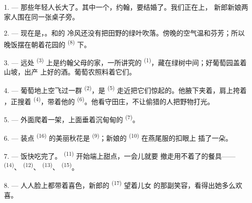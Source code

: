 
\VUsaut{4.0mm}
\VUsaut{1.6mm}
\VUsaut{3.2mm}

\VUsaut{1.6mm}
\VUsaut{2.6mm}

\VUsaut{3.0mm}

1. --- 那些年轻人长大了。其中一个，约翰，要结婚了。我们正在上，
新郎新娘两家人围在同一张桌子旁。

2. --- 现在是，。和的
冷风还没有把田野的绿叶吹落。傍晚的空气温和芬芳；所以晚饭摆在朝着花园的
 \textsuperscript{(8)} 下。

3. --- 远处 \textsuperscript{(3)} 上是约翰父母的家，一所讲究的
 \textsuperscript{(1)}，藏在绿树中间；好葡萄园盖着山坡，出产
上好的酒。葡萄农照料着它们。

4. --- 葡萄地上空飞过一群 \textsuperscript{(2)}，是
\textsuperscript{(5)} 走近把它们惊起的。他腋下夹着，肩上挎着
，正搜着 \textsuperscript{(4)}，带着他的
\textsuperscript{(6)}。他看守田庄，不让偷猎的人把野物打光。

5. --- 外面爬着一架，上面垂着沉甸甸的
 \textsuperscript{(7)}。

6. --- 装点 \textsuperscript{(16)} 的美丽秋花是
\textsuperscript{(9)}；新娘的 \textsuperscript{(10)} 在燕尾服的扣眼上
插了一朵。

7. --- 饭快吃完了。 \textsuperscript{(11)} 开始端上甜点，一会儿就要
撤走用不着了的餐具—— \textsuperscript{(14)}、
\textsuperscript{(12)}、 \textsuperscript{(13)}、
\textsuperscript{(15)}。

\VUsaut{3.0mm}

8. --- 人人脸上都带着喜色，新郎的 \textsuperscript{(17)} 望着儿女
的那副笑容，看得出她多么欢喜。

